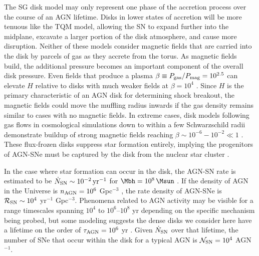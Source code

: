 The SG disk model may only represent one phase of the accretion process over the course of an AGN lifetime.
Disks in lower states of accretion will be more tenuous like the TQM model, allowing the SN to expand further into the midplane, excavate a larger portion of the disk atmosphere, and cause more disruption.
Neither of these models consider magnetic fields that are carried into the disk by parcels of gas as they accrete from the torus.
As magnetic fields build, the additional pressure becomes an important component of the overall disk pressure.
Even fields that produce a plasma $\beta \equiv P_{\rm gas} / P_{\rm mag} = 10^{2.5}$ can elevate $H$ relative to disks with much weaker fields at $\beta=10^4$ \citep{Gerling-Dunsmore+25}.
Since $H$ is the primary characteristic of an AGN disk for determining shock breakout, the magnetic fields could move the muffling radius inwards if the gas density remains similar to cases with no magnetic fields.
In extreme cases, disk models following gas flows in cosmological simulations down to within a few Schwarzschild radii demonstrate buildup of strong magnetic fields reaching $\beta \sim 10^{-6} - 10^{-2} \ll 1$ \citep{Hopkins+25}.
These flux-frozen disks suppress star formation entirely, implying the progenitors of AGN-SNe must be captured by the disk from the nuclear star cluster \citep{Fabj+20,Nasim+22}.

In the case where star formation can occur in the disk, the AGN-SN rate is estimated to be $\dot{N}_{\rm SN}\sim10^{-2}\,{\rm yr}^{-1}$ for $\Mbh=10^8\,\Msun$ \citep{HuangLinShields23}.
If the density of AGN in the Universe is $n_{\rm AGN}=10^6$ Gpc$^{-3}$ \citep{OsterbrockFerland06}, the rate density of AGN-SNe is $\mathcal{R_{\rm SN}} \sim 10^4$ yr$^{-1}$ Gpc$^{-3}$.
Phenomena related to AGN activity may be visible for a range timescales spanning $10^4$ \citep{Morganti17} to $10^6$--$10^8$ yr \citep{Biava+21} depending on the specific mechanism being probed, but some modeling suggests the dense disks we consider here have a lifetime on the order of $\tau_{\rm AGN}=10^6$ yr \citep{Angles-Alcazar+21}.
Given $\dot{N}_{\rm SN}$ over that lifetime, the number of SNe that occur within the disk for a typical AGN is $\mathcal{N}_{\rm SN}=10^4$ AGN$^{-1}$.


